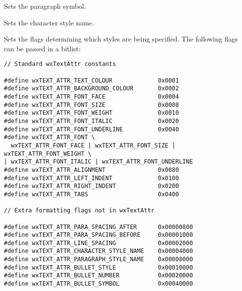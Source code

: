 \label{wxrichtextattrsetbulletsymbol}


Sets the paragraph symbol.

\label{wxrichtextattrsetcharacterstylename}


Sets the character style name.

\label{wxrichtextattrsetflags}


Sets the flags determining which styles are being specified. The following
flags can be passed in a bitlist:

{\small
\begin{verbatim}
// Standard wxTextAttr constants

#define wxTEXT_ATTR_TEXT_COLOUR             0x0001
#define wxTEXT_ATTR_BACKGROUND_COLOUR       0x0002
#define wxTEXT_ATTR_FONT_FACE               0x0004
#define wxTEXT_ATTR_FONT_SIZE               0x0008
#define wxTEXT_ATTR_FONT_WEIGHT             0x0010
#define wxTEXT_ATTR_FONT_ITALIC             0x0020
#define wxTEXT_ATTR_FONT_UNDERLINE          0x0040
#define wxTEXT_ATTR_FONT \
  wxTEXT_ATTR_FONT_FACE | wxTEXT_ATTR_FONT_SIZE | wxTEXT_ATTR_FONT_WEIGHT \
| wxTEXT_ATTR_FONT_ITALIC | wxTEXT_ATTR_FONT_UNDERLINE
#define wxTEXT_ATTR_ALIGNMENT               0x0080
#define wxTEXT_ATTR_LEFT_INDENT             0x0100
#define wxTEXT_ATTR_RIGHT_INDENT            0x0200
#define wxTEXT_ATTR_TABS                    0x0400

// Extra formatting flags not in wxTextAttr

#define wxTEXT_ATTR_PARA_SPACING_AFTER      0x00000800
#define wxTEXT_ATTR_PARA_SPACING_BEFORE     0x00001000
#define wxTEXT_ATTR_LINE_SPACING            0x00002000
#define wxTEXT_ATTR_CHARACTER_STYLE_NAME    0x00004000
#define wxTEXT_ATTR_PARAGRAPH_STYLE_NAME    0x00008000
#define wxTEXT_ATTR_BULLET_STYLE            0x00010000
#define wxTEXT_ATTR_BULLET_NUMBER           0x00020000
#define wxTEXT_ATTR_BULLET_SYMBOL           0x00040000
\end{verbatim}
}

\label{wxrichtextattrsetfontfacename}


